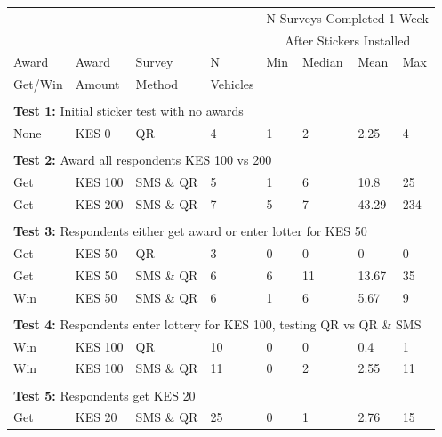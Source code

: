 \begin{tabular}{l | l | l | l | l | l | l | l} 
\hline 
 & & & & \multicolumn{4}{c}{N Surveys Completed 1 Week} \\ 
 & & & & \multicolumn{4}{c}{After Stickers Installed} \\ 
\hline 
Award   & Award  & Survey & N        & Min & Median & Mean & Max \\ 
Get/Win & Amount & Method & Vehicles &     &        &      &     \\ 
 \hline 
\multicolumn{8}{c}{} \\ 
\multicolumn{8}{l}{ \textbf{Test 1:} Initial sticker test with no awards} \\ 
\hline 
None & KES 0 & QR & 4 & 1 & 2 & 2.25 & 4 \\ 
\hline 
\multicolumn{8}{c}{} \\ 
\multicolumn{8}{l}{ \textbf{Test 2:} Award all respondents KES 100 vs 200} \\ 
\hline 
Get & KES 100 & SMS \& QR & 5 & 1 & 6 & 10.8 & 25 \\ 
 Get & KES 200 & SMS \& QR & 7 & 5 & 7 & 43.29 & 234 \\ 
\hline 
\multicolumn{8}{c}{} \\ 
\multicolumn{8}{l}{ \textbf{Test 3:} Respondents either get award or enter lotter for KES 50} \\ 
\hline 
Get & KES 50 & QR & 3 & 0 & 0 & 0 & 0 \\ 
 Get & KES 50 & SMS \& QR & 6 & 6 & 11 & 13.67 & 35 \\ 
 Win & KES 50 & SMS \& QR & 6 & 1 & 6 & 5.67 & 9 \\ 
\hline 
\multicolumn{8}{c}{} \\ 
\multicolumn{8}{l}{ \textbf{Test 4:} Respondents enter lottery for KES 100, testing QR vs QR \& SMS} \\ 
\hline 
Win & KES 100 & QR & 10 & 0 & 0 & 0.4 & 1 \\ 
 Win & KES 100 & SMS \& QR & 11 & 0 & 2 & 2.55 & 11 \\ 
\hline 
\multicolumn{8}{c}{} \\ 
\multicolumn{8}{l}{ \textbf{Test 5:} Respondents get KES 20} \\ 
\hline 
Get & KES 20 & SMS \& QR & 25 & 0 & 1 & 2.76 & 15 \\ 
\hline 
\end{tabular}